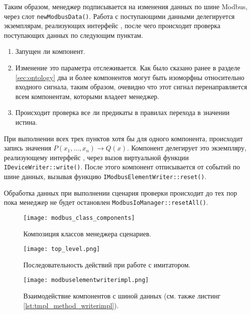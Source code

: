 Таким образом, менеджер подписывается на изменения данных по шине Modbus,
через слот \texttt{newModbusData()}.
Работа с поступающими данными делегируется экземплярам, реализующих интерфейс
\mbwriter, после чего происходит проверка поступающих данных по следующим пунктам.
\begin{enumerate}
    \item Запущен ли компонент.
    \item Изменение это параметра отслеживается. Как было сказано ранее в разделе \ref{sec:ontology}
        два и более компонентов могут быть изоморфны относительно входного сигнала,
        таким образом, очевидно что этот сигнал перенаправляется всем компонентам,
        которыми владеет менеджер.
    \item Происходит проверка все ли предикаты в правилах перехода в значении истина. 
\end{enumerate}
При выполнении всех трех пунктов хотя бы для одного компонента,
происходит запись значения $P(x_1, \ldots, x_n) \to Q(x)$.
Компонент делегирует это экземпляру, реализующему интерфейс \mbdevice,
через вызов виртуальной функции \texttt{IDeviceWriter::write()}.
После этого компонент отписывается от событий по шине данных,
вызывая функцию \texttt{IModbusElementWriter::reset()}.

Обработка данных при выполнении сценария проверки происходит до тех пор
пока менеджер не будет остановлен \texttt{ModbusIoManager::resetAll()}.


\begin{figure}[h!]\begin{center}
    \texttt{[image: modbus\_class\_components]}
    \caption{Композиция классов менеджера сценариев.}\label{fig:modbus_class_components}
%
    \vspace{5mm}
    \texttt{[image: top\_level.png]}
    \caption{Последовательность действий при работе с имитатором.}
        \label{fig:top_level_sequence}
\end{center}\end{figure}


\begin{figure}\begin{center}
    \texttt{[image: modbuselementwriterimpl.png]}
    \caption[Взаимодействие компонентов с шиной данных]
        {Взаимодействие компонентов с шиной данных (см. также листинг \ref{lst:tmpl_method_writerimpl}).}
    \label{fig:modbuselementwriterimpl}
\end{center}\end{figure}


